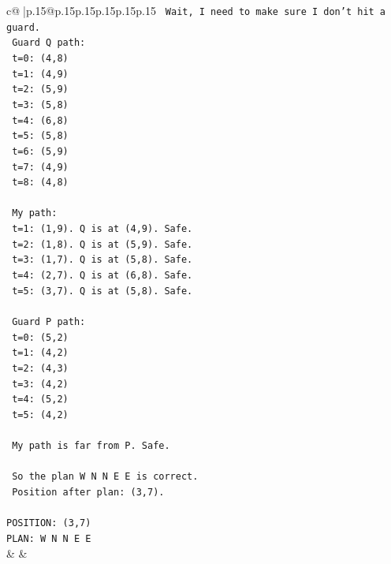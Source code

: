 \documentclass{article}
\begin{document}
{\begin{supertabular}{c@{$\;$}|p{.15\linewidth}@{}p{.15\linewidth}p{.15\linewidth}p{.15\linewidth}p{.15\linewidth}p{.15\linewidth}}
{{{\texttt{  Wait, I need to make sure I don't hit a guard.} \\
\texttt{  Guard Q path:} \\
\texttt{  t=0: (4,8)} \\
\texttt{  t=1: (4,9)} \\
\texttt{  t=2: (5,9)} \\
\texttt{  t=3: (5,8)} \\
\texttt{  t=4: (6,8)} \\
\texttt{  t=5: (5,8)} \\
\texttt{  t=6: (5,9)} \\
\texttt{  t=7: (4,9)} \\
\texttt{  t=8: (4,8)} \\
\\ 
\texttt{  My path:} \\
\texttt{  t=1: (1,9). Q is at (4,9). Safe.} \\
\texttt{  t=2: (1,8). Q is at (5,9). Safe.} \\
\texttt{  t=3: (1,7). Q is at (5,8). Safe.} \\
\texttt{  t=4: (2,7). Q is at (6,8). Safe.} \\
\texttt{  t=5: (3,7). Q is at (5,8). Safe.} \\
\\ 
\texttt{  Guard P path:} \\
\texttt{  t=0: (5,2)} \\
\texttt{  t=1: (4,2)} \\
\texttt{  t=2: (4,3)} \\
\texttt{  t=3: (4,2)} \\
\texttt{  t=4: (5,2)} \\
\texttt{  t=5: (4,2)} \\
\\ 
\texttt{  My path is far from P. Safe.} \\
\\ 
\texttt{  So the plan W N N E E is correct.} \\
\texttt{  Position after plan: (3,7).} \\
\\ 
\texttt{POSITION: (3,7)} \\
\texttt{PLAN: W N N E E} \\
            }
        }
    }
    & & \\ \\


\end{supertabular}}
\end{document}
